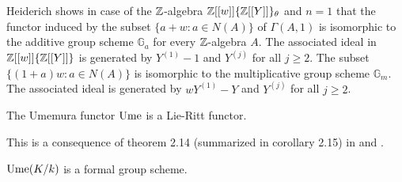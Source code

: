 Heiderich shows in case of the $\mathbb{Z}$-algebra $\mathbb{Z}[[w]]\{\mathbb{Z}[[Y]]\}_\theta$ and $n = 1$ that the functor induced by the subset $\{a + w: a \in N(A)\}$ of $\Gamma(A,1)$ is isomorphic to the additive group scheme $\mathbb{G}_a$ for every $\mathbb{Z}$-algebra $A$. The associated ideal in $\mathbb{Z}[[w]]\{\mathbb{Z}[[Y]]\}$ is generated by $Y^{(1)} - 1$ and $Y^{(j)}$ for all $j \geq 2$. The subset $\{(1 + a) w : a \in N(A)\}$ is isomorphic to the multiplicative group scheme $\mathbb{G}_m$. The associated ideal is generated by $w Y^{(1)} - Y$ and $Y^{(j)}$ for all $j \geq 2$.%
\begin{satz}
The Umemura functor $\mathrm{Ume}$ is a Lie-Ritt functor.
\end{satz}
\bws This is a consequence of theorem 2.14 (summarized in corollary 2.15) in \cite{Heid10} and \cite{Heid11}.
\begin{koro}
$\mathrm{Ume}(K/k)$ is a formal group scheme.
\end{koro}
